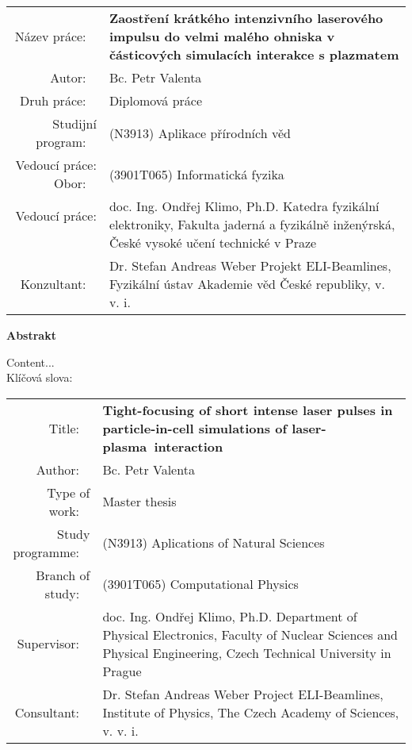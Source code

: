 \documentclass[12pt, twoside, a4paper, openright]{report}
\newcommand{\projecttitle}{Tight-focusing of short intense laser pulses in particle-in-cell simulations of laser-plasma~interaction }
\newcommand{\projecttitlecz}{Zaostření krátkého intenzivního laserového impulsu do velmi malého ohniska v částicových simulacích interakce s plazmatem }
\newcommand{\valenta}{Bc. Petr Valenta }
\newcommand{\klimo}{doc. Ing. Ondřej Klimo, Ph.D. }
\newcommand{\weber}{Dr. Stefan Andreas Weber }
\begin{document}

\newpage
\thispagestyle{empty}
\mbox{}


\newpage
\begin{flushleft}
	\renewcommand{\arraystretch}{1.3}
	\begin{tabular}{r p{12cm}}
		Název práce:
		~ & \bf \projecttitlecz \\
		Autor:
		~ & \valenta \\
		Druh práce:
		~ & Diplomová práce \\
		Studijní program:
		~ & (N3913) Aplikace přírodních věd\\
		Vedoucí práce:
		Obor:
		~ & (3901T065) Informatická fyzika\\
		Vedoucí práce:
		~ & \klimo \newline Katedra fyzikální elektroniky, Fakulta jaderná a fyzikálně inženýrská, České vysoké učení technické v Praze \\
		Konzultant:
		~ & \weber \newline Projekt ELI-Beamlines, Fyzikální ústav Akademie věd České republiky, v. v. i. \\
	\end{tabular}
\end{flushleft}

\begin{center}
\textbf{Abstrakt}\\
\end{center}

Content...\\

Klíčová slova:



\newpage
\begin{flushleft}
	\renewcommand{\arraystretch}{1.3}
	\begin{tabular}{r p{12cm}}
		Title:
		~ & \bf \projecttitle \\
		Author:
		~ & \valenta \\
		Type of work:
		~ & Master thesis \\
		Study programme:
		~ & (N3913) Aplications of Natural Sciences	 \\
		Branch of study:
		~ & (3901T065) Computational Physics \\
		Supervisor:
		~ & \klimo \newline Department of Physical Electronics, Faculty of Nuclear Sciences and Physical Engineering, Czech Technical University in Prague \\
		Consultant:
		~ & \weber \newline Project ELI-Beamlines, Institute of Physics, The Czech Academy of Sciences, v. v. i. \\
	\end{tabular}
\end{flushleft}
\end{document}
